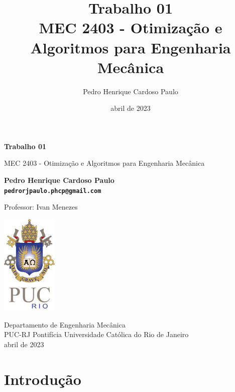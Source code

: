 \documentclass[10pt, a4paper]{article}
\begin{document}
\def\TITLE{Trabalho 01}
\def\DISCIPLINE{MEC 2403 - Otimização e Algoritmos para Engenharia Mecânica}
\def\PROFESSOR{Ivan Menezes}
\def\AUTHOR{Pedro Henrique Cardoso Paulo}
\def\CONTACT{pedrorjpaulo.phcp@gmail.com}
\def\DATE{abril de 2023}

\title{\textbf{\TITLE} \\ \DISCIPLINE}
\author{\AUTHOR}
\date{\DATE}

\begin{titlepage}
      \begin{center}
          \vspace*{1cm}

          \Huge
          \textbf{\TITLE}

          \vspace{0.5cm}
          \LARGE
          \DISCIPLINE

          \vspace{1.5cm}

          \textbf{\AUTHOR \\ {\tt \CONTACT}}

          \vfill
          Professor: \PROFESSOR

          \vspace{0.8cm}

          \includegraphics[width=0.2\textwidth]{../general/puc.jpg}

          \Large
          Departamento de Engenharia Mecânica\\
          PUC-RJ Pontifícia Universidade Católica do Rio de Janeiro\\
          \DATE

      \end{center}
  \end{titlepage}

\maketitle

\section{Introdução}
\end{document}
